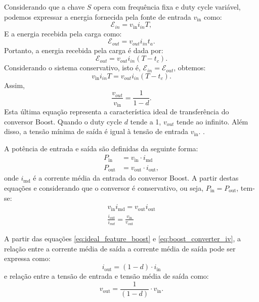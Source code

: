 Considerando que a chave $S$ opera com frequência fixa e duty cycle variável, podemos expressar a energia fornecida pela fonte de entrada $v_{\mathrm{in}}$ como: \begin{equation} \mathcal{E}_{in} = v_{\mathrm{in}} i_{in} T, \end{equation} E a energia recebida pela carga como: \begin{equation} \mathcal{E}_{out} = v_{out} i_{in} t_a. \end{equation} Portanto, a energia recebida pela carga é dada por: \begin{equation} \mathcal{E}_{out} = v_{out} i_{in} (T - t_c). \end{equation} Considerando o sistema conservativo, isto é, $\mathcal{E}_{in} = \mathcal{E}_{out}$, obtemos: \begin{equation} v_{\mathrm{in}} i_{in} T = v_{out} i_{in} (T - t_c). \end{equation} Assim, \begin{equation} \frac{v_{out}}{v_{\mathrm{in}}} = \frac{1}{1-d} \label{eq:ideal_feature_boost}.\end{equation} Esta última equação representa a característica ideal de transferência do conversor Boost. Quando o duty cycle $d$ tende a 1, $v_{out}$ tende ao infinito. Além disso, a tensão mínima de saída é igual à tensão de entrada $v_{\mathrm{in}}$. \cite{martins2008}.

A potência de entrada e saída são definidas da seguinte forma: \begin{align} P_{\mathrm{in}} &= v_{\mathrm{in}} \cdot i_{\text{md}} \\ P_{\text{out}} &= v_{\text{out}} \cdot i_{\text{out}}, \end{align} onde $i_{\text{md}}$ é a corrente média da entrada do conversor Boost. A partir destas equações e considerando que o conversor é conservativo, ou seja, $P_{\mathrm{in}} = P_{\text{out}}$, tem-se: \begin{gather} v_{\mathrm{in}} i_{\text{md}} = v_{\text{out}}i_{\text{out}} \\ \frac{i_{\text{out}}}{i_{md}} = \frac{v_{\mathrm{in}}}{v_{\text{out}}} \label{eq:boost_converter_iv} \end{gather}

A partir das equações \eqref{eq:ideal_feature_boost} e \eqref{eq:boost_converter_iv}, a relação entre a corrente média de saída a corrente média de saída pode ser expressa como: \begin{equation} i_{\text{out}} = (1 - d) \cdot i_{\mathrm{in}} \label{eq:boost_converter_current_transfer} \end{equation} e relação entre a tensão de entrada e tensão média de saída como: \begin{equation} v_{\text{out}} = \frac{1}{(1 - d)} \cdot v_{\mathrm{in}}. \label{eq:boost_converter_voltage_transfer}\end{equation}

